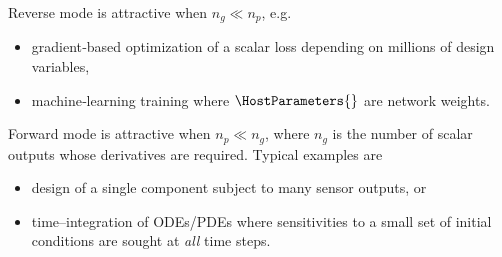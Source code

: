 Reverse mode is attractive when $n_g \ll n_p$, e.g.
\begin{itemize}
  \item gradient‐based optimization of a scalar loss depending on
        millions of design variables,
  \item machine‐learning training where $\HostParameters{}$ are network weights.
\end{itemize}

Forward mode is attractive when $n_p \ll n_g$, where $n_g$ is the number of
scalar outputs whose derivatives are required.  
Typical examples are
\begin{itemize}
  \item design of a single component subject to many sensor outputs, or
  \item time–integration of ODEs/PDEs where sensitivities to a small set of
        initial conditions are sought at \emph{all} time steps.
\end{itemize}
